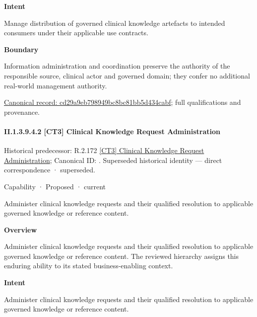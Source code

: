 \textbf{Intent}



Manage distribution of governed clinical knowledge artefacts to intended consumers under their applicable use contracts.



\textbf{Boundary}



Information administration and coordination preserve the authority of the responsible source, clinical actor and governed domain; they confer no additional real-world management authority.


{\footnotesize \href{../../../../../../../continuum/strategy/capability/cd29a9eb798949bc8bc81bb5d434cabf.md}{Canonical record: cd29a9eb798949bc8bc81bb5d434cabf}; full qualifications and provenance.}\par
\paragraph*{II.1.3.9.4.2 [CT3] Clinical Knowledge Request Administration}
\label{navigation:II.1.3.9.4.2}

{\small Historical predecessor: R.2.172 \hyperref[element:eb370c01fbdb4d22956d97e9ecd74b57]{[CT3] Clinical Knowledge Request Administration}; Canonical ID: \texttt{}. Superseded historical identity — direct correspondence · superseded.}\par
\label{element:543c53483a2249d78044c6635b7b7c48}
{\small Capability · Proposed · current}\par

Administer clinical knowledge requests and their qualified resolution to applicable governed knowledge or reference content.



\textbf{Overview}



Administer clinical knowledge requests and their qualified resolution to applicable governed knowledge or reference content. The reviewed hierarchy assigns this enduring ability to its stated business-enabling context.



\textbf{Intent}



Administer clinical knowledge requests and their qualified resolution to applicable governed knowledge or reference content.



